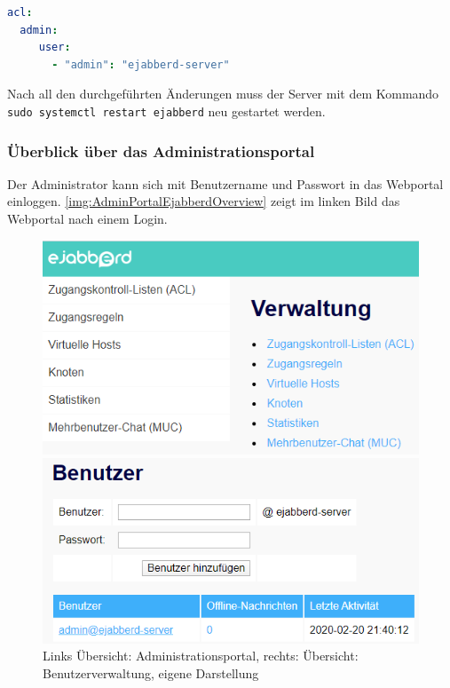 \documentclass[a4paper,titlepage,halfparskip,12pt]{scrreprt}
\begin{document}
\begin{onehalfspacing}
\bigskip

\begin{lstlisting}[language=yaml, caption={Anpassung der Access Control List (ACL) für den administrativen Zugriff},label={lst:aclChangeAdmin}]
acl:
  admin:
     user:
       - "admin": "ejabberd-server"
\end{lstlisting}


Nach all den durchgeführten Änderungen muss der Server mit dem Kommando \texttt{sudo systemctl restart ejabberd} neu gestartet werden.

\pagebreak

\subsubsection*{Überblick über das Administrationsportal}

Der Administrator kann sich mit Benutzername und Passwort in das Webportal einloggen. \autoref{img:AdminPortalEjabberdOverview} zeigt im linken Bild das Webportal nach einem Login.

\begin{figure}[h]
\centering
\begin{minipage}{.5\textwidth}
  \centering
  \includegraphics[width=.9\linewidth]{images/AdminPortalEjabberdOverview}
\end{minipage}%
\begin{minipage}{.5\textwidth}
  \centering
  \includegraphics[width=\linewidth]{images/AdminPortalAddUsers}
\end{minipage}
\caption{Links Übersicht: Administrationsportal, rechts: Übersicht: Benutzerverwaltung, eigene Darstellung}
\label{img:AdminPortalEjabberdOverview}
\end{figure}


\end{onehalfspacing}
\end{document}
